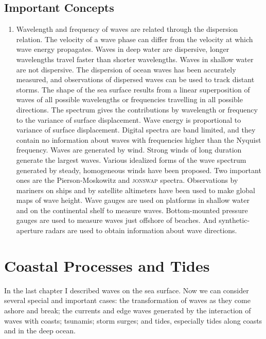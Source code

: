 \section{Important Concepts}
\begin{enumerate}
\item Wavelength and frequency of waves are related through the dispersion relation.
\vitem The velocity of a wave phase can differ from the velocity at which wave energy propagates.
\vitem Waves in deep water are dispersive, longer wavelengths travel faster than shorter wavelengths. Waves in shallow water are not dispersive.
\vitem The dispersion of ocean waves has been accurately measured, and observations of dispersed waves can be used to track distant storms.
\vitem The shape of the sea surface results from a linear superposition of waves of all possible wavelengths or frequencies travelling in all possible directions.
\vitem The spectrum gives the contributions by wavelength or frequency to the variance of surface displacement.
\vitem Wave energy is proportional to variance of surface displacement.
\vitem Digital spectra are band limited, and they contain no information about waves with frequencies higher than the Nyquist frequency.
\vitem Waves are generated by wind. Strong winds of long duration generate the largest waves.
\vitem Various idealized forms of the wave spectrum generated by steady, homogeneous winds have been proposed. Two important ones are the Pierson-Moskowitz and \textsc{jonswap} spectra.
\vitem Observations by mariners on ships and by satellite altimeters have been used to make global maps of wave height. Wave gauges are used on platforms in shallow water and on the continental shelf to measure waves. Bottom-mounted pressure gauges are used to measure waves just offshore of beaches. And synthetic-aperture radars are used to obtain information about wave
directions.
\end{enumerate}


\chapter{Coastal Processes and Tides} 
\addtocounter{figure}{1}
In the last chapter I described waves on the sea surface. Now we can consider several special and important cases: the transformation of waves as they come ashore and break; the currents and edge waves generated by the interaction of waves with coasts; tsunamis; storm surges; and tides, especially tides along coasts and in the deep ocean.

